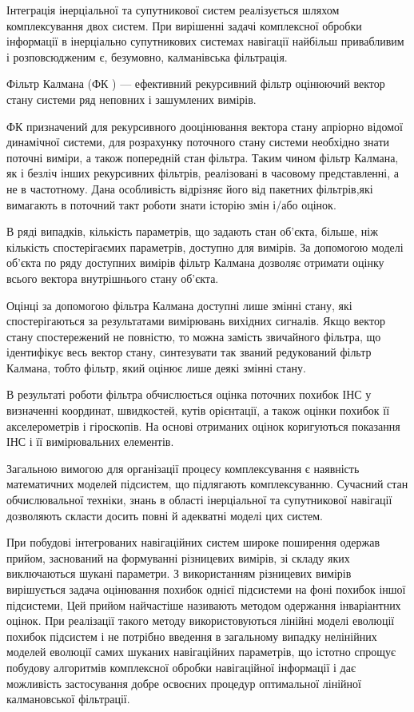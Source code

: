 Інтеграція інерціальної та супутникової систем реалізується шляхом комплексування двох
систем. При вирішенні задачі комплексної обробки інформації в інерціально супутникових
системах навігації найбільш привабливим і розповсюдженим є, безумовно, калманівська 
фільтрація.

Фільтр Калмана (ФК ) --- ефективний рекурсивний фільтр оцінюючий вектор стану системи
ряд неповних і зашумлених вимірів.

ФК призначений для рекурсивного дооцінювання вектора стану апріорно відомої динамічної
системи, для розрахунку поточного стану системи необхідно знати поточні виміри, а
також попередній стан фільтра. Таким чином фільтр Калмана, як і безліч інших
рекурсивних фільтрів, реалізовані в часовому представленні, а не в частотному.
Дана особливість відрізняє його від пакетних фільтрів,які вимагають в поточний
такт роботи знати історію змін і/або оцінок.

В ряді випадків, кількість параметрів, що задають стан об'єкта, більше, ніж кількість
спостерігаємих параметрів, доступно для вимірів. За допомогою моделі об'єкта
по ряду доступних вимірів фільтр Калмана дозволяє отримати оцінку всього вектора
внутрішнього стану об'єкта. 

Оцінці за допомогою фільтра Калмана доступні лише змінні стану, які спостерігаються 
за результатами вимірювань вихідних сигналів. Якщо вектор стану спостережений не 
повністю, то можна замість звичайного фільтра, що ідентифікує весь вектор стану, 
синтезувати так званий редукований фільтр Калмана, тобто фільтр, який оцінює лише 
деякі змінні стану.

В результаті роботи фільтра обчислюється оцінка поточних похибок ІНС 
у визначенні координат, швидкостей, кутів орієнтації, а також оцінки 
похибок її акселерометрів і гіроскопів. На основі отриманих оцінок 
коригуються показання ІНС і її вимірювальних елементів.

Загальною вимогою для організації процесу комплексування є наявність 
математичних моделей підсистем, що підлягають комплексуванню. Сучасний 
стан обчислювальної техніки, знань в області інерціальної та супутникової 
навігації дозволяють скласти досить повні й адекватні моделі цих систем.

При побудові інтегрованих  навігаційних систем широке поширення одержав 
прийом, заснований на формуванні різницевих вимірів, зі складу яких 
виключаються шукані параметри. З використанням різницевих вимірів  
вирішується задача оцінювання похибок однієї підсистеми на фоні 
похибок іншої підсистеми, Цей прийом  найчастіше називають методом 
одержання інваріантних оцінок. При реалізації такого методу 
використовуються лінійні моделі еволюції похибок підсистем  
і не потрібно введення в загальному випадку нелінійних моделей еволюції 
самих шуканих навігаційних параметрів, що істотно спрощує побудову 
алгоритмів комплексної обробки навігаційної інформації і дає можливість 
застосування добре освоєних процедур оптимальної  лінійної 
калмановської фільтрації.

